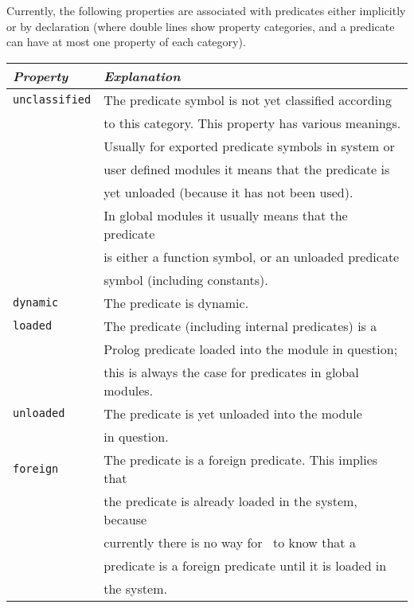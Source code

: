 \begin{description}

    Currently, the following properties are associated with predicates 
    either implicitly or by declaration (where double lines show property
    categories, and a predicate can have at most one property of each
    category).

    \begin{center}
    \begin{tabular}{||l|l||}               \hline 
	{\em Property}		& {\em Explanation} \\ \hline \hline
	{\tt unclassified}	& 
		The predicate symbol is not yet classified according  \\
	&	to this category. This property has various meanings. \\ 
	&	Usually for exported predicate symbols in system or   \\
	&	user defined modules it means that the predicate is   \\
	&	yet unloaded (because it has not been used).	      \\
	&	In global modules it usually means that the predicate \\
	&	is either a function symbol, or an unloaded predicate \\
	&	symbol (including constants). \\ \hline
	{\tt dynamic}	& 
		The predicate is dynamic. \\ \hline
	{\tt loaded}		& 
		The predicate (including internal predicates) is a \\ 
	&	Prolog predicate loaded into the module in question; \\
	&	this is always the case for predicates in global modules.\\ 
		\hline
	{\tt unloaded}		& 
		The predicate is yet unloaded into the module \\
	&	in question.\\ \hline
	{\tt foreign}	& 
		The predicate is a foreign predicate. This implies that  \\ 
	&	the predicate is already loaded in the system, because	 \\
	&	currently there is no way for \ourprolog\ to know that a \\
	&	predicate is a foreign predicate until it is loaded in	 \\
	&	the system.\\ \hline

\end{tabular}
\end{center}
\end{description}
